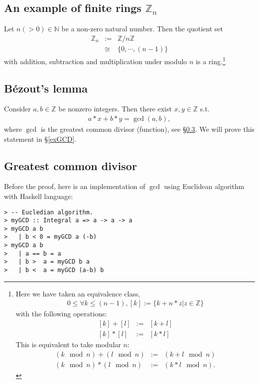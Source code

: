 \documentclass[11pt]{book}
\begin{document}
\subsection{An example of finite rings $\mathbb{Z}_n$}
Let $n (>0) \in \mathbb{N}$ be a non-zero natural number.
Then the quotient set
\begin{eqnarray}
\mathbb{Z}_n &:=& \mathbb{Z} / n\mathbb{Z} \\
&\cong& \{0, \cdots, (n-1)\}
\end{eqnarray}
with addition, subtraction and multiplication under modulo $n$ is a ring.\footnote{
Here we have taken an equivalence class, 
\begin{eqnarray}
0 \leq \forall k \leq (n-1), [k] := \{k + n*z | z \in \mathbb{Z} \}
\end{eqnarray}
with the following operations:
\begin{eqnarray}
\left[k \right] + \left[l \right] &:=& \left[k+l\right] \\
\left[k \right] * \left[l \right] &:=& \left[k * l\right]
\end{eqnarray}
This is equivalent to take modular $n$:
\begin{eqnarray}
(k \mod n) + (l \mod n) &:=& (k+l \mod n) \\
(k \mod n) * (l \mod n) &:=& (k*l \mod n).
\end{eqnarray}

}

\subsection{B\'ezout's lemma}
Consider $a,b \in \mathbb{Z}$ be nonzero integers.
Then there exist $x,y \in \mathbb{Z}$ s.t.
\begin{eqnarray}
a*x + b*y = \gcd(a,b),
\end{eqnarray}
where $\gcd$ is the greatest common divisor (function), see \S\ref{gcdDefinition}.
We will prove this statement in \S\ref{exGCD}.

\subsection{Greatest common divisor}
\label{gcdDefinition}
Before the proof, here is an implementation of $\gcd$ using Euclidean algorithm with Haskell language:

\begin{verbatim}
> -- Eucledian algorithm.
> myGCD :: Integral a => a -> a -> a
> myGCD a b
>   | b < 0 = myGCD a (-b)
> myGCD a b
>   | a == b = a
>   | b >  a = myGCD b a
>   | b <  a = myGCD (a-b) b
\end{verbatim}
\end{document}
